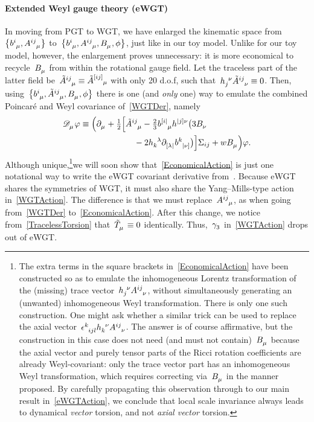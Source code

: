 \documentclass[aps,prd,reprint,preprintnumbers,showpacs,floatfix,nofootinbib,superscript address]{revtex4-2}
\begin{document}
\paragraph*{Extended Weyl gauge theory (eWGT)} In moving from PGT to WGT, we have enlarged the kinematic space from~$\big\{\FieldB{^i_\mu},\FieldA{^{ij}_\mu}\big\}$ to~$\big\{\FieldB{^i_\mu},\FieldA{^{ij}_\mu},\FieldV{_\mu},\phi\big\}$, just like in our toy model. Unlike for our toy model, however, the enlargement proves unnecessary: it is more economical to recycle~$\FieldV{_\mu}$ from within the rotational gauge field. Let the traceless part of the latter field be~$\FieldATilde{^{ij}_{\mu}}\equiv\FieldATilde{^{[ij]}_{\mu}}$ with only 20 d.o.f, such that~$\FieldH{_j^\nu}\FieldATilde{^{ij}_\nu}\equiv 0$. Then, using~$\big\{\FieldB{^i_\mu},\FieldATilde{^{ij}_\mu},\FieldV{_\mu},\phi\big\}$ there is one (and \emph{only} one) way to emulate the combined Poincar\'e and Weyl covariance of~\cref{WGTDer}, namely
\begin{align}
	\SCovD{_\mu}\varphi\equiv\Big(\PD{_\mu}+\tfrac{1}{2}\Big[&\FieldATilde{^{ij}_\mu}-\tfrac{2}{3}\FieldB{^{[i|}_\mu}\FieldH{^{|j]}^\nu}\big(3\FieldV{_\nu}
	\nonumber\\&\ \ \ 
	-2\FieldH{_k^\lambda}\PD{_{[\lambda|}}\FieldB{^k_{|\nu]}}\big)\Big]\Sigma{_{ij}}+w\FieldV{_\mu}\Big)\varphi.\label{EconomicalAction}
\end{align}
Although unique,\footnote{The extra terms in the square brackets in~\cref{EconomicalAction} have been constructed so as to emulate the inhomogeneous Lorentz transformation of the (missing) trace vector~$\FieldH{_j^\nu}\FieldA{^{ij}_\nu}$, without simultaneously generating an (unwanted) inhomogeneous Weyl transformation. There is only one such construction. One might ask whether a similar trick can be used to replace the axial vector~$\tensor{\epsilon}{^k_{ijl}}\FieldH{_k^\nu}\FieldA{^{ij}_\nu}$. The answer is of course affirmative, but the construction in this case does not need (and must not contain)~$\FieldV{_\mu}$ because the axial vector and purely tensor parts of the Ricci rotation coefficients are already Weyl-covariant: only the trace vector part has an inhomogeneous Weyl transformation, which requires correcting via~$\FieldV{_\mu}$ in the manner proposed. By carefully propagating this observation through to our main result in~\cref{eWGTAction}, we conclude that local scale invariance always leads to dynamical \emph{vector} torsion, and not \emph{axial vector} torsion.}we will soon show that~\cref{EconomicalAction} is just one notational way to write the eWGT covariant derivative from~\cite{Lasenby:2015dba}. Because eWGT shares the symmetries of WGT, it must also share the Yang--Mills-type action in~\cref{WGTAction}. The difference is that we must replace~$\FieldA{^{ij}_\mu}$, as when going from~\cref{WGTDer} to~\cref{EconomicalAction}. After this change, we notice from~\cref{TracelessTorsion} that~$\MAGTTilde{_\mu}\equiv 0$ identically. Thus,~$\Gam{3}$ in~\cref{WGTAction} drops out of eWGT.
\end{document}
